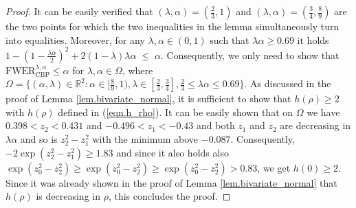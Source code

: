 \documentclass {imsart}
\newcommand{\FWERcb}{\mathrm{FWER}_{\mathrm{CBP}}^{\lambda,\alpha}}
\newcommand{\R}{\mathbb{R}}                 %
\begin{document}

\begin{proof}
It can be easily verified that $(\lambda,\alpha)=(\tfrac{2}{3},1)$ and $(\lambda,\alpha)=(\tfrac{3}{4},\tfrac{8}{9})$ are the two points for which the two inequalities in the lemma simultaneously turn into equalities. Moreover, for any $\lambda,\alpha\in(0,1)$ such that $\lambda\alpha\geq0.69$ it holds $1-(1-\tfrac{\lambda\alpha}{2})^2+2(1-\lambda)\lambda\alpha\;\leq\;\alpha$. Consequently, we only need to show that $\FWERcb\leq\alpha$ for $\lambda,\alpha\in\Omega$, where $\Omega=\{(\alpha,\lambda)\in\R^2:\alpha\in[\tfrac{8}{9},1),\lambda\in[\tfrac{2}{3},\tfrac{3}{4}],\tfrac{2}{3}\leq\lambda\alpha\leq0.69\}$. As discussed in the proof of Lemma \ref{lem.bivariate_normal}, it is sufficient to show that $h(\rho)\geq2$ with $h(\rho)$ defined in (\ref{eqn.h_rho}). It can be easily shown that on $\Omega$ we have $0.398<z_2<0.431$ and $-0.496<z_1<-0.43$ and both $z_1$ and $z_2$ are decreasing in $\lambda\alpha$ and so is $z_2^2-z_1^2$ with the minimum above $-0.087$. Consequently, $-2\exp(z_2^2-z_1^2)\geq1.83$ and since it also holds also $\exp(z_0^2-z_2^2)\geq\exp(z_0^2-z_2^2)\geq\exp(z_0^2-z_2^2)>0.83$, we get $h(0)\geq2$. Since it was already shown in the proof of Lemma \ref{lem.bivariate_normal} that $h(\rho)$ is decreasing in $\rho$, this concludes the proof.
\end{proof}
\end{document}
